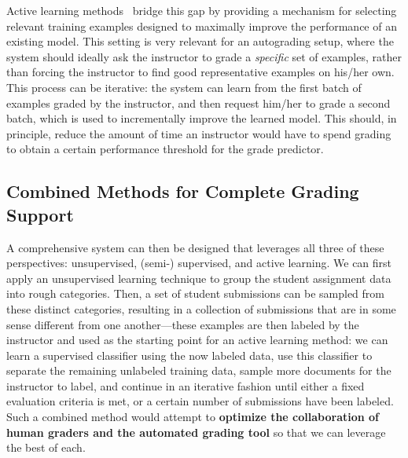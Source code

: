 Active learning methods~\cite{Settles:2012} bridge this gap by providing a
mechanism for selecting relevant training examples designed to maximally
improve the performance of an existing model. This setting is very relevant
for an autograding setup, where the system should ideally ask the
instructor to grade a \emph{specific} set of examples, rather than forcing
the instructor to find good representative examples on his/her own. This
process can be iterative: the system can learn from the first batch of
examples graded by the instructor, and then request him/her to grade a
second batch, which is used to incrementally improve the learned model.
This should, in principle, reduce the amount of time an instructor would
have to spend grading to obtain a certain performance threshold for the
grade predictor.

\subsection{Combined Methods for Complete Grading Support}

A comprehensive system can then be designed that leverages all three of
these perspectives: unsupervised, (semi-) supervised, and active learning.
We can first apply an unsupervised learning technique to group the student
assignment data into rough categories. Then, a set of student submissions
can be sampled from these distinct categories, resulting in a collection of
submissions that are in some sense different from one another---these
examples are then labeled by the instructor and used as the starting point
for an active learning method: we can learn a supervised classifier using
the now labeled data, use this classifier to separate the remaining
unlabeled training data, sample more documents for the instructor to label,
and continue in an iterative fashion until either a fixed evaluation
criteria is met, or a certain number of submissions have been labeled.
Such a combined method would attempt to {\bf optimize the collaboration of
human graders and the automated grading tool}  so that we can leverage the
best of each.
